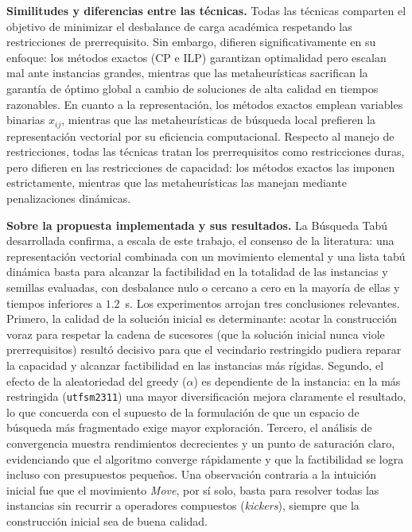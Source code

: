 \documentclass[letter, 10pt]{article}
\begin{document}
\textbf{Similitudes y diferencias entre las t\'ecnicas.} Todas las 
t\'ecnicas comparten el objetivo de minimizar el desbalance de carga 
acad\'emica respetando las restricciones de prerrequisito. Sin 
embargo, difieren significativamente en su enfoque: los m\'etodos 
exactos (CP e ILP) garantizan optimalidad pero escalan mal ante 
instancias grandes, mientras que las metaheur\'isticas sacrifican 
la garant\'ia de \'optimo global a cambio de soluciones de alta 
calidad en tiempos razonables. En cuanto a la representaci\'on, los 
m\'etodos exactos emplean variables binarias $x_{ij}$, mientras que 
las metaheur\'isticas de b\'usqueda local prefieren la representaci\'on 
vectorial por su eficiencia computacional. Respecto al manejo de 
restricciones, todas las t\'ecnicas tratan los prerrequisitos como 
restricciones duras, pero difieren en las restricciones de capacidad: 
los m\'etodos exactos las imponen estrictamente, mientras que las
metaheur\'isticas las manejan mediante penalizaciones din\'amicas.

\textbf{Sobre la propuesta implementada y sus resultados.} La B\'usqueda Tab\'u
desarrollada confirma, a escala de este trabajo, el consenso de la literatura:
una representaci\'on vectorial combinada con un movimiento elemental y una lista
tab\'u din\'amica basta para alcanzar la factibilidad en la totalidad de las
instancias y semillas evaluadas, con desbalance nulo o cercano a cero en la
mayor\'ia de ellas y tiempos inferiores a $1.2$~s. Los experimentos arrojan tres
conclusiones relevantes. Primero, la calidad de la soluci\'on inicial es
determinante: acotar la construcci\'on voraz para respetar la cadena de
sucesores (que la soluci\'on inicial nunca viole prerrequisitos) result\'o
decisivo para que el vecindario restringido pudiera reparar la capacidad y
alcanzar factibilidad en las instancias m\'as r\'igidas. Segundo, el efecto de la
aleatoriedad del greedy ($\alpha$) es dependiente de la instancia: en la m\'as
restringida (\texttt{utfsm2311}) una mayor diversificaci\'on mejora claramente el
resultado, lo que concuerda con el supuesto de la formulaci\'on de que un espacio
de b\'usqueda m\'as fragmentado exige mayor exploraci\'on. Tercero, el an\'alisis
de convergencia muestra rendimientos decrecientes y un punto de saturaci\'on
claro, evidenciando que el algoritmo converge r\'apidamente y que la factibilidad
se logra incluso con presupuestos peque\~nos. Una observaci\'on contraria a la
intuici\'on inicial fue que el movimiento \textit{Move}, por s\'i solo, basta para
resolver todas las instancias sin recurrir a operadores compuestos
(\textit{kickers}), siempre que la construcci\'on inicial sea de buena calidad.
\end{document}
